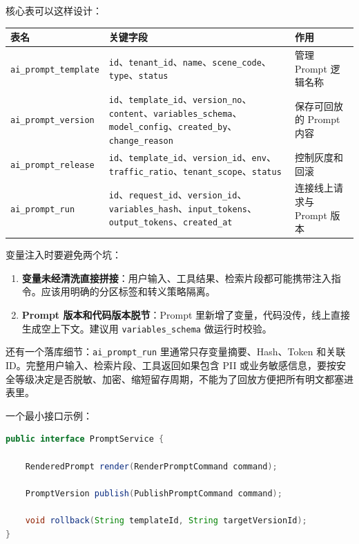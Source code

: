 \documentclass[10pt,a4paper]{ctexart}
\begin{document}
核心表可以这样设计：


{\footnotesize
\begin{tabularx}{\textwidth}{|X|X|X|}
\hline
\textbf{表名} & \textbf{关键字段} & \textbf{作用} \\
\hline
\texttt{ai\_prompt\_template} & \texttt{id}、\texttt{tenant\_id}、\texttt{name}、\texttt{scene\_code}、\texttt{type}、\texttt{status} & 管理 Prompt 逻辑名称 \\
\hline
\texttt{ai\_prompt\_version} & \texttt{id}、\texttt{template\_id}、\texttt{version\_no}、\texttt{content}、\texttt{variables\_schema}、\texttt{model\_config}、\texttt{created\_by}、\texttt{change\_reason} & 保存可回放的 Prompt 内容 \\
\hline
\texttt{ai\_prompt\_release} & \texttt{id}、\texttt{template\_id}、\texttt{version\_id}、\texttt{env}、\texttt{traffic\_ratio}、\texttt{tenant\_scope}、\texttt{status} & 控制灰度和回滚 \\
\hline
\texttt{ai\_prompt\_run} & \texttt{id}、\texttt{request\_id}、\texttt{version\_id}、\texttt{variables\_hash}、\texttt{input\_tokens}、\texttt{output\_tokens}、\texttt{created\_at} & 连接线上请求与 Prompt 版本 \\
\hline
\end{tabularx}
}



变量注入时要避免两个坑：


\begin{enumerate}[itemsep=2pt, topsep=4pt]
  \item \textbf{变量未经清洗直接拼接}：用户输入、工具结果、检索片段都可能携带注入指令。应该用明确的分区标签和转义策略隔离。
  \item \textbf{Prompt 版本和代码版本脱节}：Prompt 里新增了变量，代码没传，线上直接生成空上下文。建议用 \texttt{variables\_schema} 做运行时校验。
\end{enumerate}


还有一个落库细节：\texttt{ai\_prompt\_run} 里通常只存变量摘要、Hash、Token 和关联 ID。完整用户输入、检索片段、工具返回如果包含 PII 或业务敏感信息，要按安全等级决定是否脱敏、加密、缩短留存周期，不能为了回放方便把所有明文都塞进表里。



一个最小接口示例：



\begin{lstlisting}[language=Java]
public interface PromptService {

    RenderedPrompt render(RenderPromptCommand command);

    PromptVersion publish(PublishPromptCommand command);

    void rollback(String templateId, String targetVersionId);
}
\end{lstlisting}
\end{document}
